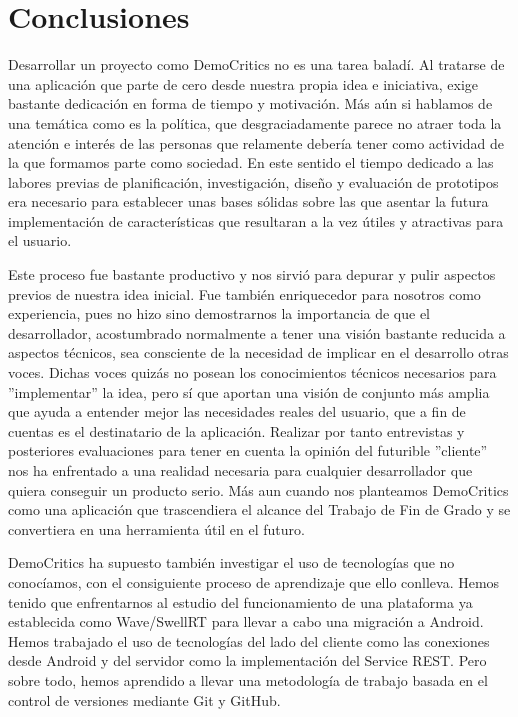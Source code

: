\newpage
\thispagestyle{sectioned}
\chapter{Conclusiones}

Desarrollar un proyecto como DemoCritics no es una tarea baladí. Al tratarse de una aplicación que parte de cero desde nuestra propia idea e iniciativa, exige bastante dedicación en forma de tiempo y motivación. Más aún si hablamos de una temática como es la política, que desgraciadamente parece no atraer toda la atención e interés de las personas que relamente debería tener como actividad de la que formamos parte como sociedad. En este sentido el tiempo dedicado a las labores previas de planificación, investigación, diseño y evaluación de prototipos era necesario para establecer unas bases sólidas sobre las que asentar la futura implementación de características que resultaran a la vez útiles y atractivas para el usuario.

Este proceso fue bastante productivo y nos sirvió para depurar y pulir aspectos previos de nuestra idea inicial. Fue también enriquecedor para nosotros como experiencia, pues no hizo sino demostrarnos la importancia de que el desarrollador, acostumbrado normalmente a tener una visión   bastante reducida a aspectos técnicos, sea consciente de la necesidad de implicar en el desarrollo otras voces. Dichas voces quizás no posean los conocimientos técnicos necesarios para ''implementar'' la idea, pero sí que aportan una visión de conjunto más amplia que ayuda a entender mejor las necesidades reales del usuario, que a fin de cuentas es el destinatario de la aplicación. Realizar por tanto entrevistas y posteriores evaluaciones para tener en cuenta la opinión del futurible ''cliente'' nos ha enfrentado a una realidad necesaria para cualquier desarrollador que quiera conseguir un producto serio. Más aun cuando nos planteamos DemoCritics como una aplicación que trascendiera el alcance del Trabajo de Fin de Grado y se convertiera en una herramienta útil en el futuro.

DemoCritics ha supuesto también investigar el uso de tecnologías que no conocíamos, con el consiguiente proceso de aprendizaje que ello conlleva. Hemos tenido que enfrentarnos al estudio del funcionamiento de una plataforma ya establecida como Wave/SwellRT para llevar a cabo una migración a Android. Hemos trabajado el uso de tecnologías del lado del cliente como las conexiones desde Android y del servidor como la implementación del Service REST. Pero sobre todo, hemos aprendido a llevar una metodología de trabajo basada en el control de versiones mediante Git y GitHub.

